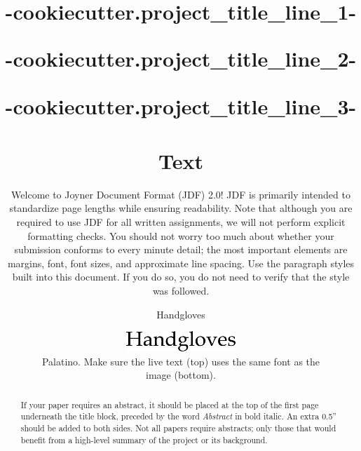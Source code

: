 

\title{
  {{-cookiecutter.project_title_line_1-}} \\

  {%
    {{-cookiecutter.project_title_line_2-}} \\
  {%

  {%
    {{-cookiecutter.project_title_line_3-}} \\
  {%
  }



\maketitle
\thispagestyle{fancy}

% 

\begin{abstract}
If your paper requires an abstract, it should be placed at the top of the first page underneath the title block, preceded by the word \emph{Abstract} in bold italic. An extra 0.5'' should be added to both sides. Not all papers require abstracts; only those that would benefit from a high-level summary of the project or its background.
\end{abstract}

\section{Text}
Welcome to Joyner Document Format (JDF) 2.0! JDF is primarily intended to standardize page lengths while ensuring readability. Note that although you are required to use JDF for all written assignments, we will not perform explicit formatting checks. You should not worry too much about whether your submission conforms to every minute detail; the most important elements are margins, font, font sizes, and approximate line spacing. Use the paragraph styles built into this document. If you do so, you do not need to verify that the style was followed.

\huge\centerline{Handgloves}\normalsize

\begin{figure}[H]
  \centering
  \includegraphics[scale=0.7]{figs/example-image1}
  \caption{Palatino. Make sure the live text (top) uses the same font as the image (bottom).}
  \label{fig::1}
\end{figure}

}}}}
